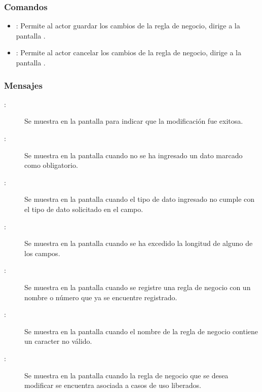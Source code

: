 \subsubsection{Comandos}
\begin{itemize}
	\item {}: Permite al actor guardar los cambios de la regla de negocio, dirige a la pantalla .
	\item {}: Permite al actor cancelar los cambios de la regla de negocio, dirige a la pantalla .
\end{itemize}

\subsubsection{Mensajes}
	
\begin{description}
	\item[:] Se muestra en la pantalla  para indicar que la modificación fue exitosa.
	\item[:] Se muestra en la pantalla  cuando no se ha ingresado un dato marcado como obligatorio.
	\item[:] Se muestra en la pantalla  cuando el tipo de dato ingresado no cumple con el tipo de dato solicitado en el campo.
	\item[:] Se muestra en la pantalla  cuando se ha excedido la longitud de alguno de los campos.
	\item[:] Se muestra en la pantalla  cuando se registre una regla de negocio con un nombre o número que ya se encuentre registrado.
	\item[:] Se muestra en la pantalla  cuando el nombre de la regla de negocio contiene un caracter no válido.
	\item[:] Se muestra en la pantalla  cuando la regla de negocio que se desea modificar se encuentra asociada a casos de uso liberados.
\end{description}
